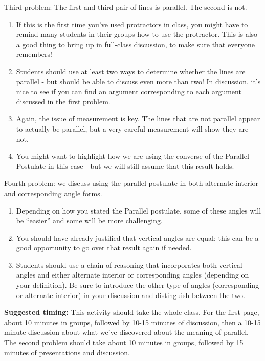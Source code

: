 \documentclass[nooutcomes,noauthor]{ximera}
\begin{document}
\begin{instructorNotes}
Third problem:  The first and third pair of lines is parallel.  The second is not.
\begin{enumerate}
\item If this is the first time you've used protractors in class, you might have to remind many students in their groups how to use the protractor.  This is also a good thing to bring up in full-class discussion, to make sure that everyone remembers!
\item Students should use at least two ways to determine whether the lines are parallel - but should be able to discuss even more than two!  In discussion, it's nice to see if you can find an argument corresponding to each argument discussed in the first problem.  
\item Again, the issue of measurement is key.  The lines that are not parallel appear to actually be parallel, but a very careful measurement will show they are not.
\item You might want to highlight how we are using the converse of the Parallel Postulate in this case - but we will still assume that this result holds.
\end{enumerate}

Fourth problem: we discuss using the parallel postulate in both alternate interior and corresponding angle forms.
\begin{enumerate}
	\item Depending on how you stated the Parallel postulate, some of these angles will be ``easier'' and some will be more challenging.
	\item You should have already justified that vertical angles are equal; this can be a good opportunity to go over that result again if needed.
	\item Students should use a chain of reasoning that incorporates both vertical angles and either alternate interior or corresponding angles (depending on your definition). Be sure to introduce the other type of angles (corresponding or alternate interior) in your discussion and distinguish between the two.
\end{enumerate}


{\bf Suggested timing:} This activity should take the whole class.  For the first page, about 10 minutes in groups, followed by 10-15 minutes of discussion, then a 10-15 minute discussion about what we've discovered about the meaning of parallel.  The second problem should take about 10 minutes in groups, followed by 15 minutes of presentations and discussion.

\end{instructorNotes}
\end{document}
